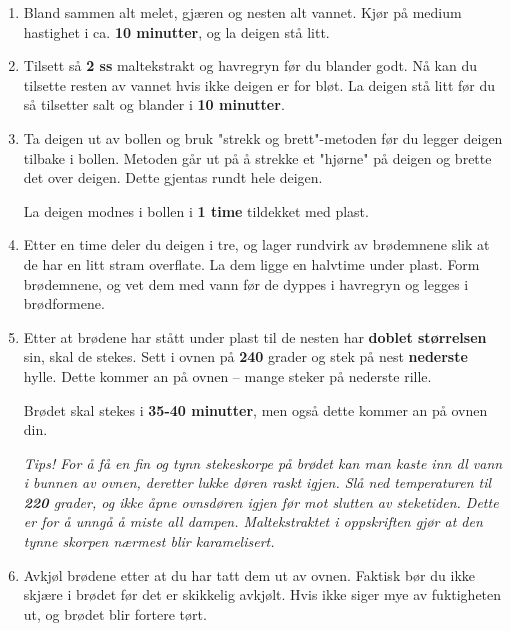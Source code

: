 \begin{enumerate}
    \item 
    Bland sammen alt melet, gjæren og nesten alt vannet. 
    Kjør på medium hastighet i ca. \textbf{10 minutter}, og la deigen stå litt.
    
    \item 
    Tilsett så \textbf{2 ss} maltekstrakt og havregryn før du blander godt. 
    Nå kan du tilsette resten av vannet hvis ikke deigen er for bløt. 
    La deigen stå litt før du så tilsetter salt og blander i \textbf{10 minutter}.
    
    \item
    Ta deigen ut av bollen og bruk "strekk og brett"-metoden før du legger deigen tilbake i bollen. 
    Metoden går ut på å strekke et "hjørne" på deigen og brette det over deigen. Dette gjentas rundt hele deigen.
    
    La deigen modnes i bollen i \textbf{1 time} tildekket med plast.
    
    \item 
    Etter en time deler du deigen i tre, og lager rundvirk av brødemnene slik at de har en litt stram overflate. 
    La dem ligge en halvtime under plast. 
    Form brødemnene, og vet dem med vann før de dyppes i havregryn og legges i brødformene.
    
    \item
    Etter at brødene har stått under plast til de nesten har \textbf{doblet størrelsen} sin, skal de stekes. 
    Sett i ovnen på \textbf{240} grader og stek på nest \textbf{nederste} hylle. 
    Dette kommer an på ovnen – mange steker på nederste rille.
    
    Brødet skal stekes i \textbf{35-40 minutter}, men også dette kommer an på ovnen din. 
    
    \textit{\small Tips! 
    For å få en fin og tynn stekeskorpe på brødet kan man kaste inn  dl vann i bunnen av ovnen, deretter lukke døren raskt igjen. 
    Slå ned temperaturen til \textbf{220} grader, og ikke åpne ovnsdøren igjen før mot slutten av steketiden. 
    Dette er for å unngå å miste all dampen. 
    Maltekstraktet i oppskriften gjør at den tynne skorpen nærmest blir karamelisert.}
    
    \item
    Avkjøl brødene etter at du har tatt dem ut av ovnen. 
    Faktisk bør du ikke skjære i brødet før det er skikkelig avkjølt. 
    Hvis ikke siger mye av fuktigheten ut, og brødet blir fortere tørt.
\end{enumerate}